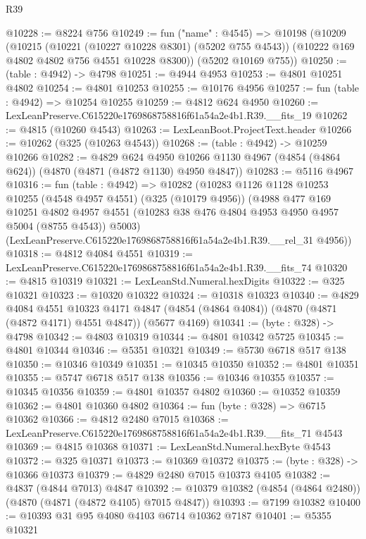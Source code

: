 \begin{lexlean}{R39}
\begin{coremodule}
@10228 := @8224 @756
@10249 := fun ("name" : @4545) =>
  @10198
    (@10209
      (@10215
        (@10221 (@10227 @10228 @8301) (@5202 @755 @4543))
        (@10222 @169 @4802 @4802 @756 @4551 @10228 @8300))
      (@5202 @10169 @755))
@10250 := (table : @4942) -> @4798
@10251 := @4944 @4953
@10253 := @4801 @10251 @4802
@10254 := @4801 @10253
@10255 := @10176 @4956
@10257 := fun (table : @4942) => @10254 @10255
@10259 := @4812 @624 @4950
@10260 := LexLeanPreserve.C615220e1769868758816f61a54a2e4b1.R39.__fits_19
@10262 := @4815 (@10260 @4543)
@10263 := LexLeanBoot.ProjectText.header
@10266 := @10262 (@325 (@10263 @4543))
@10268 := (table : @4942) -> @10259 @10266
@10282 := @4829
    @624
    @4950
    @10266
    @1130
    @4967
    (@4854 (@4864 @624))
    (@4870 (@4871 (@4872 @1130) @4950 @4847))
@10283 := @5116 @4967
@10316 := fun (table : @4942) =>
  @10282
    (@10283
      @1126
      @1128
      @10253
      @10255
      (@4548 @4957 @4551)
      (@325 (@10179 @4956))
      (@4988
        @477
        @169
        @10251
        @4802
        @4957
        @4551
        (@10283 @38 @476 @4804 @4953 @4950 @4957 @5004 (@8755 @4543))
        @5003)
      (LexLeanPreserve.C615220e1769868758816f61a54a2e4b1.R39.__rel_31 @4956))
@10318 := @4812 @4084 @4551
@10319 := LexLeanPreserve.C615220e1769868758816f61a54a2e4b1.R39.__fits_74
@10320 := @4815 @10319
@10321 := LexLeanStd.Numeral.hexDigits
@10322 := @325 @10321
@10323 := @10320 @10322
@10324 := @10318 @10323
@10340 := @4829
    @4084
    @4551
    @10323
    @4171
    @4847
    (@4854 (@4864 @4084))
    (@4870 (@4871 (@4872 @4171) @4551 @4847))
    (@5677 @4169)
@10341 := (byte : @328) -> @4798
@10342 := @4803 @10319
@10344 := @4801 @10342 @5725
@10345 := @4801 @10344
@10346 := @5351 @10321
@10349 := @5730 @6718 @517 @138
@10350 := @10346 @10349
@10351 := @10345 @10350
@10352 := @4801 @10351
@10355 := @5747 @6718 @517 @138
@10356 := @10346 @10355
@10357 := @10345 @10356
@10359 := @4801 @10357 @4802
@10360 := @10352 @10359
@10362 := @4801 @10360 @4802
@10364 := fun (byte : @328) => @6715 @10362
@10366 := @4812 @2480 @7015
@10368 := LexLeanPreserve.C615220e1769868758816f61a54a2e4b1.R39.__fits_71 @4543
@10369 := @4815 @10368
@10371 := LexLeanStd.Numeral.hexByte @4543
@10372 := @325 @10371
@10373 := @10369 @10372
@10375 := (byte : @328) -> @10366 @10373
@10379 := @4829 @2480 @7015 @10373 @4105
@10382 := @4837 (@4844 @7013) @4847
@10392 := @10379 @10382 (@4854 (@4864 @2480)) (@4870 (@4871 (@4872 @4105) @7015 @4847))
@10393 := @7199 @10382
@10400 := @10393 @31 @95 @4080 @4103 @6714 @10362 @7187
@10401 := @5355 @10321

\end{coremodule}
\end{lexlean}
